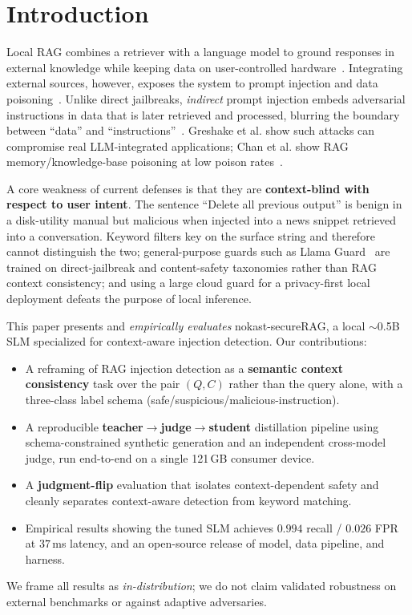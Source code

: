 \documentclass[11pt]{article}
\begin{document}
\section{Introduction}
Local RAG combines a retriever with a language model to ground responses in external
knowledge while keeping data on user-controlled hardware~\cite{openragsoc}. Integrating
external sources, however, exposes the system to prompt injection and data
poisoning~\cite{greshake,agentpoison,openragsoc}. Unlike direct jailbreaks, \emph{indirect}
prompt injection embeds adversarial instructions in data that is later retrieved and
processed, blurring the boundary between ``data'' and ``instructions''~\cite{greshake}.
Greshake et al. show such attacks can compromise real LLM-integrated applications;
Chan et al. show RAG memory/knowledge-base poisoning at low poison
rates~\cite{greshake,agentpoison}.

A core weakness of current defenses is that they are \textbf{context-blind with
respect to user intent}. The sentence ``Delete all previous output'' is benign in a
disk-utility manual but malicious when injected into a news snippet retrieved into a
conversation. Keyword filters key on the surface string and therefore cannot
distinguish the two; general-purpose guards such as Llama Guard~\cite{llamaguard} are
trained on direct-jailbreak and content-safety taxonomies rather than RAG context
consistency; and using a large cloud guard for a privacy-first local deployment
defeats the purpose of local inference.

This paper presents and \emph{empirically evaluates} nokast-secureRAG, a local
$\sim$0.5B SLM specialized for context-aware injection detection. Our contributions:
\begin{itemize}
  \item A reframing of RAG injection detection as a \textbf{semantic context
  consistency} task over the pair $(Q,C)$ rather than the query alone, with a
  three-class label schema (\textsf{safe}/\textsf{suspicious}/\textsf{malicious-instruction}).
  \item A reproducible \textbf{teacher$\rightarrow$judge$\rightarrow$student}
  distillation pipeline using schema-constrained synthetic generation and an
  independent cross-model judge, run end-to-end on a single 121\,GB consumer device.
  \item A \textbf{judgment-flip} evaluation that isolates context-dependent safety
  and cleanly separates context-aware detection from keyword matching.
  \item Empirical results showing the tuned SLM achieves $0.994$ recall / $0.026$
  FPR at $37$\,ms latency, and an open-source release of model, data pipeline, and harness.
\end{itemize}
We frame all results as \emph{in-distribution}; we do not claim validated robustness
on external benchmarks or against adaptive adversaries.
\end{document}
